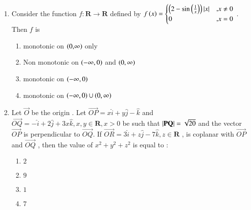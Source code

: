 \documentclass[journal,12pt,onecolumn]{IEEEtran}
\theoremstyle{remark}
\begin{document}
\begin{enumerate}
    \item Consider the function $ f : \mathbf{R} \rightarrow \mathbf{R}$ defined by $ f\left(x\right) = \begin{cases} \left(2 - \sin{\ensuremath{\left(\frac{1}{x}\right)}}\right)\left\vert x\right\vert & \text{,} x \neq 0 \\ 0 & \text{,} x=0 \end{cases}$ . Then $f$ is
        \begin{enumerate}
            \item monotonic on $\left( 0 \text{,} \infty\right)$ only
            \item Non monotonic on $\left(-\infty , 0\right)$ and $\left(0, \infty\right)$
            \item monotonic on $\left(-\infty , 0\right)$
            \item monotonic on $\left(-\infty , 0\right) \cup \left(0 , \infty\right) $\\
        \end{enumerate}
   \item Let $\vec{O}$ be the origin . Let $\vec{OP} = x \hat{i} + y\hat{j} -\hat{k}$ and $\vec{OQ}= -\hat{i} + 2\hat{j} + 3x\hat{k} , x,y \in \mathbf{R} , x >0$ be such that $\left\vert\mathbf{PQ}\right\vert = \sqrt{20}$ and the vector $\vec{OP}$ is perpendicular to $\vec{OQ}$. If $\vec{OR} = 3\hat{i} + z\hat{j} - 7\hat{k} , z \in \mathbf{R}$ , is coplanar with $\vec{OP}$ and $\vec{OQ}$ , then the value of $x^2 + y^2 + z^2$ is equal to :
   \begin{multicols}{2}
   \begin{enumerate}
       \item $2$
       \item $9$
       \item $1$
       \item $7$
   \end{enumerate}
   \end{multicols}


\end{enumerate}
\end{document}
